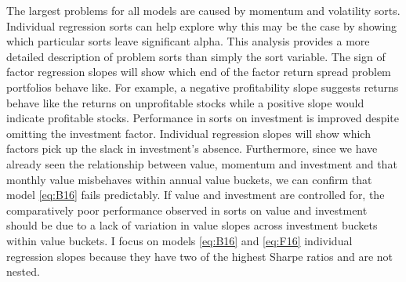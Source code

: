 The largest problems for all models are caused by momentum and volatility
sorts.
Individual regression sorts can help explore why this may be the case by
showing which particular sorts leave significant alpha.
This analysis provides a more detailed description of problem sorts than simply
the sort variable.
The sign of factor regression slopes will show which end of the factor return
spread problem portfolios behave like.
For example, a negative profitability slope suggests returns behave like
the returns on unprofitable stocks while a positive slope would indicate
profitable stocks.
Performance in sorts on investment is improved despite omitting the investment
factor. Individual regression slopes will show which factors pick up the slack
in investment's absence.
Furthermore, since we have already seen the relationship between value,
momentum and investment and that monthly value misbehaves within annual value
buckets, we can confirm that model \ref{eq:B16} fails predictably.
If value and investment are controlled for, the comparatively poor performance
observed in sorts on value and investment should be due to a lack of variation
in value slopes across investment buckets within value buckets.
I focus on models \ref{eq:B16} and \ref{eq:F16} individual regression slopes
because they have two of the highest Sharpe ratios and are not nested.

